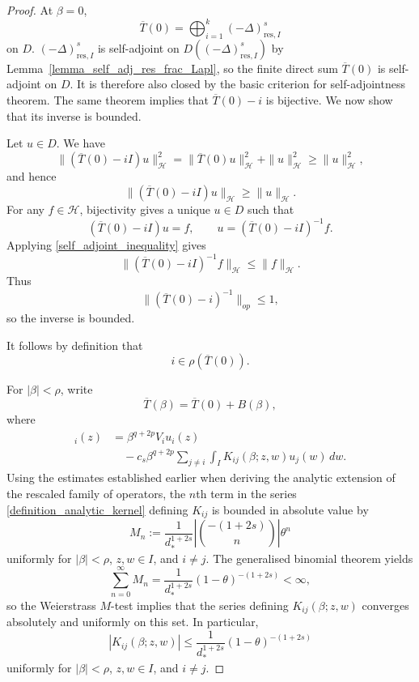 \documentclass[preprint,12pt]{elsarticle}
\newcommand{\fvect}[1]{\mathbf{#1}}
\begin{document}
\begin{proof}
At $\beta=0$,
\[
    \overline{T}(0)
    =
    \bigoplus_{i=1}^k (-\Delta)^s_{\mathrm{res},I}
\]
on $D$. $(-\Delta)^s_{\mathrm{res},I}$ is self-adjoint on
$D((-\Delta)^s_{\mathrm{res},I})$ by
Lemma~\ref{lemma_self_adj_res_frac_Lapl}, so the finite direct sum
$\overline{T}(0)$ is self-adjoint on $D$. It is therefore also closed by the basic criterion for self-adjointness theorem.
\cite[Thm.~VIII.3, p.~257, Vol.~1]{RS} The same theorem implies that
$\overline{T}(0)-i$ is bijective. We now show that its inverse is bounded.

Let $u\in D$. We have
\[
    \|(\overline{T}(0)-iI)u\|_{\mathcal H}^2
    =
    \|\overline{T}(0)u\|_{\mathcal H}^2
    +
    \|u\|_{\mathcal H}^2
    \geq
    \|u\|_{\mathcal H}^2,
\]
and hence
\begin{equation}\label{self_adjoint_inequality}
    \|(\overline{T}(0)-iI)u\|_{\mathcal H}
    \geq
    \|u\|_{\mathcal H}.
\end{equation}
For any $f\in\mathcal H$, bijectivity gives a unique $u\in D$ such that
\[
    (\overline{T}(0)-iI)u=f,
    \qquad
    u=(\overline{T}(0)-iI)^{-1}f.
\]
Applying \eqref{self_adjoint_inequality} gives
\[
    \|(\overline{T}(0)-iI)^{-1}f\|_{\mathcal H}
    \leq
    \|f\|_{\mathcal H}.
\]
Thus
\[
    \|(\overline{T}(0)-i)^{-1}\|_{op}
    \leq 1,
\]
so the inverse is bounded. 

It follows by definition
\cite[p.~253, Vol.~1]{RS} that
\[
    i\in\rho(\overline{T}(0)).
\]

For $|\beta|<\rho$, write
\[
    \overline{T}(\beta)
    =
    \overline{T}(0)+B(\beta),
\]
where
\begin{align*}
    [B(\beta)\fvect{u}]_i(z)
    &=
    \beta^{q+2p}V_i u_i(z) \\
    &\quad
    -c_s\beta^{q+2p}
    \sum_{j\neq i}
    \int_I
    K_{ij}(\beta;z,w)u_j(w)\,dw .
\end{align*}
Using the estimates established earlier when deriving the analytic extension of the rescaled family of operators, the $n$th term in the series
\eqref{definition_analytic_kernel} defining $K_{ij}$ is bounded in
absolute value by
\[
    M_n
    :=
    \frac{1}{d_*^{1+2s}}
    \left|
        \binom{-(1+2s)}{n}
    \right|
    \theta^n
\]
uniformly for $|\beta|<\rho$, $z,w\in I$, and $i\neq j$. The generalised binomial theorem yields
\[
    \sum_{n=0}^{\infty} M_n
    =
    \frac{1}{d_*^{1+2s}}
    (1-\theta)^{-(1+2s)}
    <\infty,
\]
so the Weierstrass $M$-test implies that the series defining
$K_{ij}(\beta;z,w)$ converges absolutely and uniformly on this set. In particular,
\[
    |K_{ij}(\beta;z,w)|
    \leq
    \frac{1}{d_*^{1+2s}}
    (1-\theta)^{-(1+2s)}
\]
uniformly for $|\beta|<\rho$, $z,w\in I$, and $i\neq j$.


\end{proof}
\end{document}
